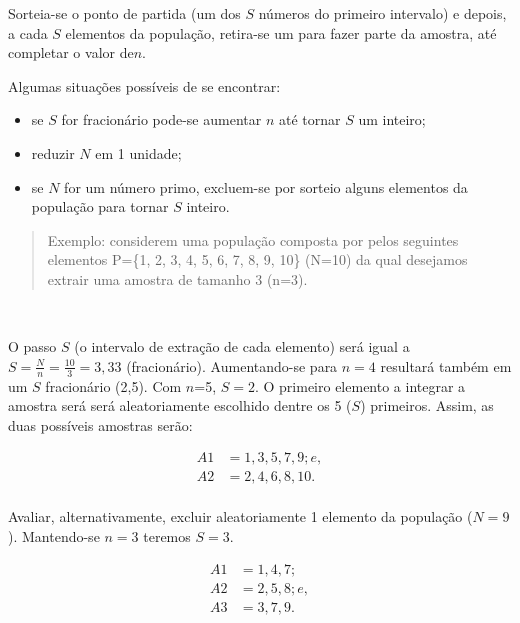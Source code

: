 \documentclass[
]{book}
\providecommand{\tightlist}{%
  \setlength{\itemsep}{0pt}\setlength{\parskip}{0pt}}
\begin{document}
Sorteia-se o ponto de partida (um dos \(S\) números do primeiro intervalo) e depois, a cada \(S\) elementos da população, retira-se um para fazer parte da amostra, até completar o valor de\(n\).

\hfill\break

Algumas situações possíveis de se encontrar:

\hfill\break

\begin{itemize}
\tightlist
\item
  se \(S\) for fracionário pode-se aumentar \(n\) até tornar \(S\) um inteiro;\\
\item
  reduzir \(N\) em 1 unidade;
\item
  se \(N\) for um número primo, excluem-se por sorteio alguns elementos da população para tornar \(S\) inteiro.
\end{itemize}

\hfill\break

\begin{quote}
Exemplo: considerem uma população composta por pelos seguintes elementos P=\{1, 2, 3, 4, 5, 6, 7, 8, 9, 10\} (N=10) da qual desejamos extrair uma amostra de tamanho 3 (n=3).
\end{quote}

~

O passo \(S\) (o intervalo de extração de cada elemento) será igual a \(S=\frac{N}{n}=\frac{10}{3}=3,33\) (fracionário). Aumentando-se para \(n=4\) resultará também em um \(S\) fracionário (2,5). Com \(n\)=5, \(S=2\). O primeiro elemento a integrar a amostra será será aleatoriamente escolhido dentre os 5 (\(S\)) primeiros. Assim, as duas possíveis amostras serão:

\hfill\break

\begin{align*}
A1 & = {1, 3, 5, 7, 9}; e, \\
A2 & = {2, 4, 6, 8, 10}. \\
\end{align*}

\hfill\break

Avaliar, alternativamente, excluir aleatoriamente 1 elemento da população (\(N=9\)). Mantendo-se \(n=3\) teremos \(S=3\).

\hfill\break

\begin{align*}
A1 & = {1, 4, 7}; \\
A2 & = {2, 5, 8}; e, \\
A3 & = {3, 7, 9}. \\
\end{align*}
\end{document}
